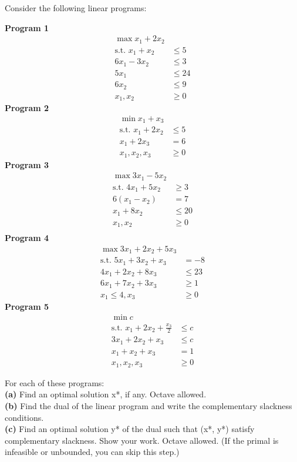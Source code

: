 \documentclass[fleqn]{homework}
\begin{document}
  \begin{problem}{2}
    \begin{question}
      Consider the following linear programs:
      \begin{multicols}{3}
      \noindent \textbf{Program 1}
      \begin{align*}
        \max x_1 + 2x_2 & \\
        \text{s.t.  } x_1 + x_2 &\le 5 \\
        6x_1 - 3x_2 &\le3 \\
        5x_1 &\le 24 \\
        6x_2 &\le 9 \\
        x_1, x_2 &\ge 0
      \end{align*}
      \textbf{Program 2}
      \begin{align*}
        \min x_1 + x_3 & \\
        \text{s.t.  } x_1 + 2x_2 &\le 5 \\
        x_1 + 2x_3 &= 6 \\
        x_1, x_2, x_3 &\ge 0
      \end{align*}
      \textbf{Program 3}
      \begin{align*}
        \max 3x_1 - 5x_2 & \\
        \text{s.t.  } 4x_1 + 5x_2 &\ge 3 \\
        6(x_1 - x_2) &= 7 \\
        x_1 + 8x_2 &\le 20 \\
        x_1, x_2 &\ge 0 \\
      \end{align*}
      \textbf{Program 4}
      \begin{align*}
        \max 3x_1 + 2x_2 + 5x_3 & \\
        \text{s.t.  } 5x_1 + 3x_2 + x_3 &= -8 \\
        4x_1 + 2x_2+ 8x_3 &\le 23 \\
        6x_1 + 7x_2 + 3x_3 &\ge 1 \\
        x_1 \le 4, x_3 &\ge 0
      \end{align*}
      \textbf{Program 5}
      \begin{align*}
        \min c & \\
        \text{s.t.  } x_1 + 2x_2 + \frac{x_3}{2} &\le c \\
        3x_1 + 2x_2 + x_3 &\le c \\
        x_1 + x_2 + x_3 &= 1 \\
        x_1, x_2, x_3 &\ge 0
      \end{align*}
      \end{multicols}
      For each of these programs:\\
      \textbf{(a)} Find an optimal solution x*, if any. Octave allowed.\\
      \textbf{(b)} Find the dual of the linear program and write the
      complementary slackness conditions.\\
      \textbf{(c)} Find an optimal solution y* of the dual such that (x*, y*)
      satisfy complementary slackness. Show your work.  Octave allowed. (If the
      primal is infeasible or unbounded, you can skip this step.)
    \end{question}


\end{problem}
\end{document}
